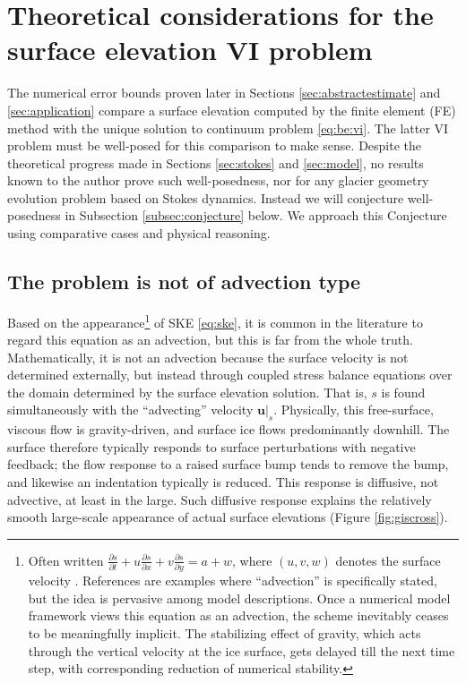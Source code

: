 \documentclass[hidelinks,onefignum,onetabnum,final]{siamart220329}  %
\newcommand{\bu}{\mathbf{u}}
\begin{document}
\section{Theoretical considerations for the surface elevation VI problem} \label{sec:theory}

The numerical error bounds proven later in Sections \ref{sec:abstractestimate} and \ref{sec:application} compare a surface elevation computed by the finite element (FE) method with the unique solution to continuum problem \eqref{eq:be:vi}.  The latter VI problem must be well-posed for this comparison to make sense.  Despite the theoretical progress made in Sections \ref{sec:stokes} and \ref{sec:model}, no results known to the author prove such well-posedness, nor for any glacier geometry evolution problem based on Stokes dynamics.  Instead we will conjecture well-posedness in Subsection \ref{subsec:conjecture} below.  We approach this Conjecture using comparative cases and physical reasoning.

\subsection{The problem is not of advection type} \label{subsec:notadv}  Based on the appearance\footnote{Often written $\frac{\partial s}{\partial t} + u \frac{\partial s}{\partial x} + v \frac{\partial s}{\partial y} = a + w$, where $(u,v,w)$ denotes the surface velocity \cite{GreveBlatter2009,SchoofHewitt2013}.  References \cite{Chengetal2020,WirbelJarosch2020} are examples where ``advection'' is specifically stated, but the idea is pervasive among model descriptions.  Once a numerical model framework views this equation as an advection, the scheme inevitably ceases to be meaningfully implicit.  The stabilizing effect of gravity, which acts through the vertical velocity at the ice surface, gets delayed till the next time step, with corresponding reduction of numerical stability.} of SKE \eqref{eq:ske}, it is common in the literature to regard this equation as an advection, but this is far from the whole truth.  Mathematically, it is not an advection because the surface velocity is not determined externally, but instead through coupled stress balance equations over the domain determined by the surface elevation solution.  That is, $s$ is found simultaneously with the ``advecting'' velocity $\bu|_s$.  Physically, this free-surface, viscous flow is gravity-driven, and surface ice flows predominantly downhill.  The surface therefore typically responds to surface perturbations with negative feedback; the flow response to a raised surface bump tends to remove the bump, and likewise an indentation typically is reduced.  This response is diffusive, not advective, at least in the large.  Such diffusive response explains the relatively smooth large-scale appearance of actual surface elevations (Figure \ref{fig:giscross}).
\end{document}
